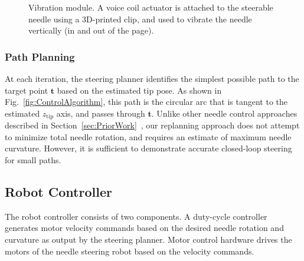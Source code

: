 \begin{figure}[!t]
\caption[Vibration module]{Vibration module. A voice coil actuator is attached to the steerable needle using a 3D-printed clip, and used to vibrate the needle vertically (in and out of the page).}
\label{fig:Vibrator}
\end{figure}

\subsubsection{Path Planning}
At each iteration, the steering planner identifies the simplest possible path to the target point $\bm{t}$ based on the estimated tip pose. As shown in Fig.~\ref{fig:ControlAlgorithm}, this path is the circular arc that is tangent to the estimated $z_{\text{tip}}$ axis, and passes through $\bm{t}$. Unlike other needle control approaches described in Section~\ref{sec:PriorWork}~\cite{Abayazid2014,Rucker2013}, our replanning approach does not attempt to minimize total needle rotation, and requires an estimate of maximum needle curvature. However, it is sufficient to demonstrate accurate closed-loop steering for small paths. 

\subsection{Robot Controller} 
The robot controller consists of two components. A duty-cycle controller generates motor velocity commands based on the desired needle rotation and curvature as output by the steering planner. Motor control hardware drives the motors of the needle steering robot based on the velocity commands.

